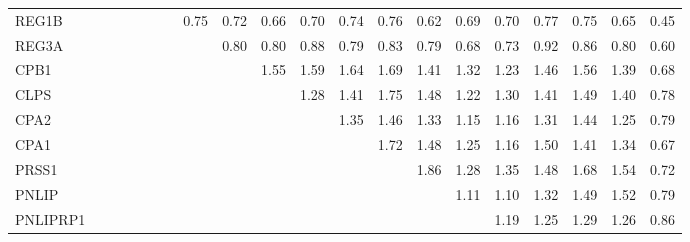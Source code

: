 \begin{longtable}{lrrrrrrrrrrrrrrrrrrr}
REG1B    &              &              &              &              &             &             &        0.75 &       0.72 &       0.66 &       0.70 &       0.74 &        0.76 &        0.62 &           0.69 &          0.70 &        0.77 &        0.75 &       0.65 &        0.45 \\
REG3A    &              &              &              &              &             &             &             &       0.80 &       0.80 &       0.88 &       0.79 &        0.83 &        0.79 &           0.68 &          0.73 &        0.92 &        0.86 &       0.80 &        0.60 \\
CPB1     &              &              &              &              &             &             &             &            &       1.55 &       1.59 &       1.64 &        1.69 &        1.41 &           1.32 &          1.23 &        1.46 &        1.56 &       1.39 &        0.68 \\
CLPS     &              &              &              &              &             &             &             &            &            &       1.28 &       1.41 &        1.75 &        1.48 &           1.22 &          1.30 &        1.41 &        1.49 &       1.40 &        0.78 \\
CPA2     &              &              &              &              &             &             &             &            &            &            &       1.35 &        1.46 &        1.33 &           1.15 &          1.16 &        1.31 &        1.44 &       1.25 &        0.79 \\
CPA1     &              &              &              &              &             &             &             &            &            &            &            &        1.72 &        1.48 &           1.25 &          1.16 &        1.50 &        1.41 &       1.34 &        0.67 \\
PRSS1    &              &              &              &              &             &             &             &            &            &            &            &             &        1.86 &           1.28 &          1.35 &        1.48 &        1.68 &       1.54 &        0.72 \\
PNLIP    &              &              &              &              &             &             &             &            &            &            &            &             &             &           1.11 &          1.10 &        1.32 &        1.49 &       1.52 &        0.79 \\
PNLIPRP1 &              &              &              &              &             &             &             &            &            &            &            &             &             &                &          1.19 &        1.25 &        1.29 &       1.26 &        0.86 \\

\end{longtable}
